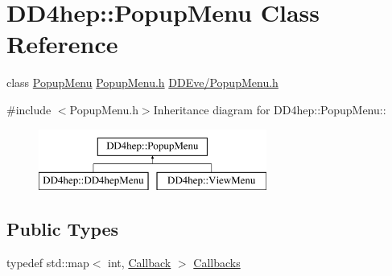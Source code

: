 \hypertarget{class_d_d4hep_1_1_popup_menu}{
\section{DD4hep::PopupMenu Class Reference}
\label{class_d_d4hep_1_1_popup_menu}
}


class \hyperlink{class_d_d4hep_1_1_popup_menu}{PopupMenu} \hyperlink{_popup_menu_8h}{PopupMenu.h} \hyperlink{_popup_menu_8h}{DDEve/PopupMenu.h}  


{\ttfamily \#include $<$PopupMenu.h$>$}Inheritance diagram for DD4hep::PopupMenu::\begin{figure}[H]
\begin{center}
\leavevmode
\includegraphics[height=2cm]{class_d_d4hep_1_1_popup_menu}
\end{center}
\end{figure}
\subsection*{Public Types}
\begin{DoxyCompactItemize}
\item 
typedef std::map$<$ int, \hyperlink{class_d_d4hep_1_1_callback}{Callback} $>$ \hyperlink{class_d_d4hep_1_1_popup_menu_aea53283ce44fa4935d8b7a3751ad1b5b}{Callbacks}
\end{DoxyCompactItemize}
